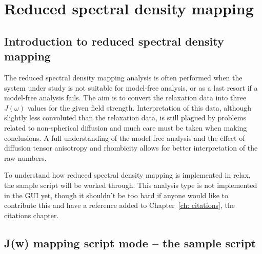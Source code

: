 
\chapter{Reduced spectral density mapping} \label{ch: J(w) mapping}


\section{Introduction to reduced spectral density mapping}

The reduced spectral density mapping analysis is often performed when the system under study is not suitable for model-free analysis, or as a last resort if a model-free analysis fails.  The aim is to convert the relaxation data into three $J(\omega)$ values for the given field strength.  Interpretation of this data, although slightly less convoluted than the relaxation data, is still plagued by problems related to non-spherical diffusion and much care must be taken when making conclusions.  A full understanding of the model-free analysis and the effect of diffusion tensor anisotropy and rhombicity allows for better interpretation of the raw numbers.

To understand how reduced spectral density mapping is implemented in relax, the sample script will be worked through.  This analysis type is not implemented in the GUI yet, though it shouldn't be too hard if anyone would like to contribute this and have a reference added to Chapter~\ref{ch: citations}, the citations chapter.



\section{J(w) mapping script mode -- the sample script}

